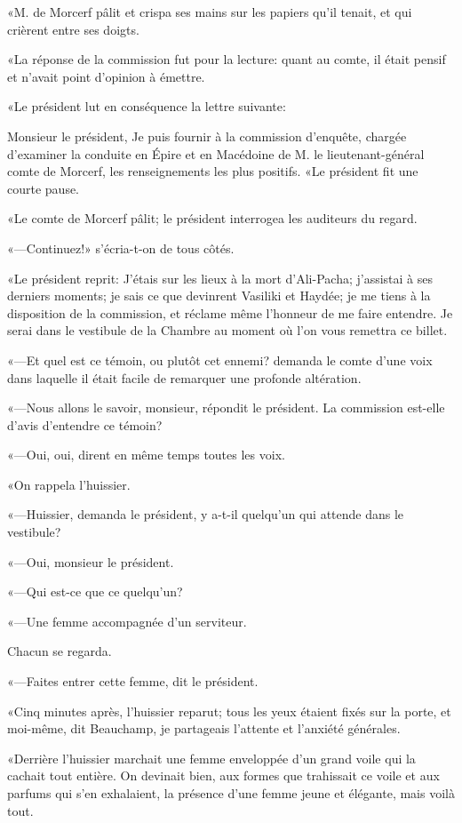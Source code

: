«M. de Morcerf pâlit et crispa ses mains sur les papiers qu'il tenait, et qui crièrent entre ses doigts. 

«La réponse de la commission fut pour la lecture: quant au comte, il était pensif et n'avait point d'opinion à émettre. 

«Le président lut en conséquence la lettre suivante: 

\begin{mail}{}{Monsieur le président,} 
Je puis fournir à la commission d'enquête, chargée d'examiner la conduite en Épire et en Macédoine de M. le lieutenant-général comte de Morcerf, les renseignements les plus positifs.
\pausemail
«Le président fit une courte pause. 

«Le comte de Morcerf pâlit; le président interrogea les auditeurs du regard. 

«—Continuez!» s'écria-t-on de tous côtés. 

«Le président reprit: 
\resumemail
J'étais sur les lieux à la mort d'Ali-Pacha; j'assistai à ses derniers moments; je sais ce que devinrent Vasiliki et Haydée; je me tiens à la disposition de la commission, et réclame même l'honneur de me faire entendre. Je serai dans le vestibule de la Chambre au moment où l'on vous remettra ce billet. 
\end{mail}

«—Et quel est ce témoin, ou plutôt cet ennemi? demanda le comte d'une voix dans laquelle il était facile de remarquer une profonde altération. 

«—Nous allons le savoir, monsieur, répondit le président. La commission est-elle d'avis d'entendre ce témoin? 

«—Oui, oui, dirent en même temps toutes les voix. 

«On rappela l'huissier. 

«—Huissier, demanda le président, y a-t-il quelqu'un qui attende dans le vestibule? 

«—Oui, monsieur le président. 

«—Qui est-ce que ce quelqu'un? 

«—Une femme accompagnée d'un serviteur. 

Chacun se regarda. 

«—Faites entrer cette femme, dit le président. 

«Cinq minutes après, l'huissier reparut; tous les yeux étaient fixés sur la porte, et moi-même, dit Beauchamp, je partageais l'attente et l'anxiété générales. 

«Derrière l'huissier marchait une femme enveloppée d'un grand voile qui la cachait tout entière. On devinait bien, aux formes que trahissait ce voile et aux parfums qui s'en exhalaient, la présence d'une femme jeune et élégante, mais voilà tout. 

